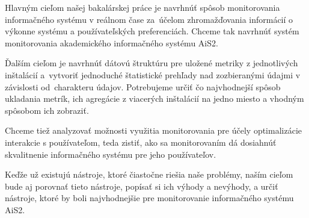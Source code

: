 \documentclass[a4paper, upjsfrontpage, thesismargins, thesislinespacing]{rnthesis}
\begin{document}

Hlavným cieľom našej bakalárskej práce je navrhnúť spôsob monitorovania informačného systému v reálnom čase za~úče\-lom zhromažďovania informácií o výkonne systému a používateľských pre\-ferenciách. 
Chceme tak navrhnúť systém monitorovania akademického informačného systému AiS2.

Ďalším cieľom je navrhnúť dátovú štruktúru pre uložené metriky z jednotlivých inštalácií a~vytvoriť jednoduché štatistické prehľady nad zozbieranými údajmi v závis\-losti od~charakteru údajov.
Potrebujeme určiť čo najvhodnejší spôsob ukladania metrík, ich agregácie z viacerých inštalácií na jedno miesto a vhodným spôsobom ich zobraziť.

Chceme tiež analyzovať možnosti využitia monitorovania pre účely optimalizácie interakcie s používateľom, teda zistiť, ako sa monitorovaním dá dosiahnúť skvalitnenie informačného systému pre jeho používateľov.

Keďže už existujú nástroje, ktoré čiastočne riešia naše problémy, naším cieľom bude aj porovnať tieto nástroje, popísať si ich výhody a nevýhody, a určiť nástroje, ktoré by boli najvhodnejšie pre monitorovanie informačného systému AiS2.

\newpage



\end{document}
